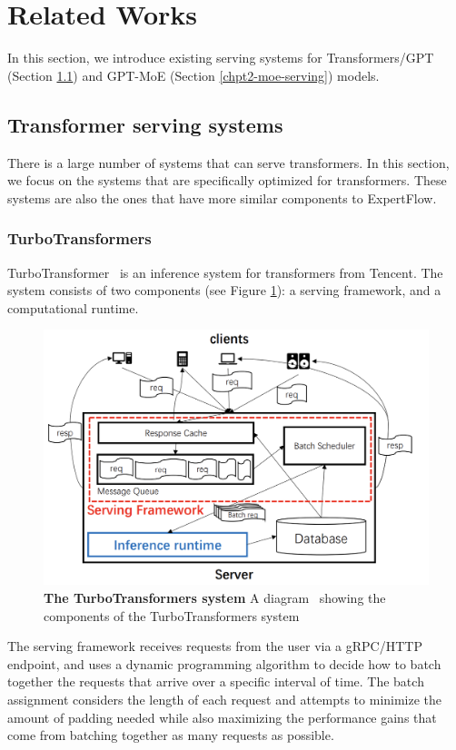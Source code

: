 \section{Related Works}\label{related-works}
In this section, we introduce existing serving systems for Transformers/GPT (Section \ref{transformer-serving}) and GPT-MoE (Section \ref{chpt2-moe-serving}) models.

\subsection{Transformer serving systems}\label{transformer-serving}
There is a large number of systems that can serve transformers. In this section, we focus on the systems that are specifically optimized for transformers. These systems are also the ones that have more similar components to ExpertFlow.

\subsubsection{TurboTransformers}
TurboTransformer~\cite{turbo_transformers} is an inference system for transformers from Tencent. The system consists of two components (see Figure \ref{fig:turbo-transformers}): a serving framework, and a computational runtime.

\begin{figure}[H]
    \centering
    \includegraphics[width=0.6\linewidth]{figures/turbo_transformers.png}
    \caption{\textbf{The TurboTransformers system} A diagram~\cite{fastermoe} showing the components of the TurboTransformers system}
    \label{fig:turbo-transformers}
\end{figure}

The serving framework receives requests from the user via a gRPC/HTTP endpoint, and uses a dynamic programming algorithm to decide how to batch together the requests that arrive over a specific interval of time. The batch assignment considers the length of each request and attempts to minimize the amount of padding needed while also maximizing the performance gains that come from batching together as many requests as possible. 

